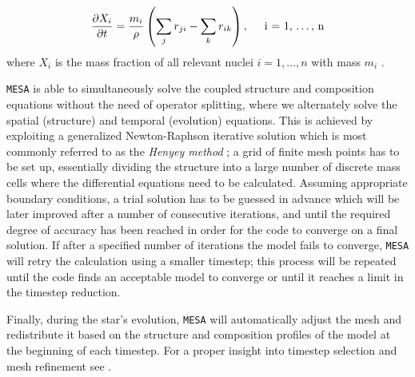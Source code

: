 \documentclass[../../main/thesis_msc.tex]{subfiles}
\begin{document}
				\begin{align} \label{eq:composition}
					 \frac{\partial X_i}{\partial t} = \frac{m_i}{\rho} \left( \sum_j r_{ji} - \sum_k r_{ik} \right), \hspace{0.5cm} \text{i = 1, $\dots$, n}
				\end{align}
				where $X_i$ is the mass fraction of all relevant nuclei $i = 1, \dots , n$ with mass $m_i$ \cite[][p. 89]{Kipp_book}.
				
    			
    			\texttt{MESA} is able to simultaneously solve the coupled structure and composition equations without the need of operator splitting, where we alternately solve the spatial (structure) and temporal (evolution) equations. This is achieved by exploiting a generalized Newton-Raphson iterative solution which is most commonly referred to as the \emph{Henyey method} \citep[][p. 106]{Wilson1981, Kipp_book}; a grid of finite mesh points has to be set up, essentially dividing the structure into a large number of discrete mass cells where the differential equations need to be calculated. Assuming appropriate boundary conditions, a trial solution has to be guessed in advance which will be later improved after a number of consecutive iterations, and until the required degree of accuracy has been reached in order for the code to converge on a final solution. If after a specified number of iterations the model fails to converge, \texttt{MESA} will retry the calculation using a smaller timestep; this process will be repeated until the code finds an acceptable model to converge or until it reaches a limit in the timestep reduction.
    			
    			Finally, during the star's evolution, \texttt{MESA} will automatically adjust the mesh and redistribute it based on the structure and composition profiles of the model at the beginning of each timestep. For a proper insight into timestep selection and mesh refinement see \cite{Paxton2011}.
    			
\end{document}
